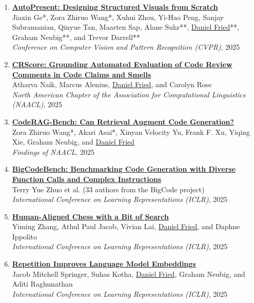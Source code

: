 \begin{enumerate}[leftmargin=-1mm,partopsep=0pt]
\item \href{https://arxiv.org/abs/2501.00912}{\textbf{AutoPresent: Designing Structured Visuals from Scratch}} \\
  Jiaxin Ge*, Zora Zhiruo Wang*, Xuhui Zhou, Yi-Hao Peng, Sanjay Subramanian, Qinyue Tan, Maarten Sap, Alane Suhr**, \underline{Daniel Fried}**, Graham Neubig**, and Trevor Darrell**\\
  \emph{Conference on Computer Vision and Pattern Recognition (CVPR)}, 2025

\item \href{https://arxiv.org/abs/2409.19801}{\textbf{CRScore: Grounding Automated Evaluation of Code Review Comments in Code Claims and Smells}} \\
  Atharva Naik, Marcus Alenius, \underline{Daniel Fried}, and Carolyn Rose\\
  \emph{North American Chapter of the Association for Computational Linguistics (NAACL)}, 2025

\item \href{https://arxiv.org/abs/2406.14497}{\textbf{{CodeRAG-Bench}: Can Retrieval Augment Code Generation?}} \\
  Zora Zhiruo Wang*, Akari Asai*, Xinyan Velocity Yu, Frank F. Xu, Yiqing Xie, Graham Neubig, and \underline{Daniel Fried}\\
  \emph{Findings of NAACL}, 2025

\item \href{https://arxiv.org/abs/2406.15877}{\textbf{{BigCodeBench}: Benchmarking Code Generation with Diverse Function Calls and Complex Instructions}} \\
  Terry Yue Zhuo et al. (33 authors from the BigCode project)\\
  \emph{International Conference on Learning Representations (ICLR)}, 2025

\item \href{https://arxiv.org/abs/2410.03893}{\textbf{Human-Aligned Chess with a Bit of Search}} \\
  Yiming Zhang, Athul Paul Jacob, Vivian Lai, \underline{Daniel Fried}, and Daphne Ippolito\\
  \emph{International Conference on Learning Representations (ICLR)}, 2025

\item \href{https://arxiv.org/abs/2402.15449}{\textbf{Repetition Improves Language Model Embeddings}} \\
  Jacob Mitchell Springer, Suhas Kotha, \underline{Daniel Fried}, Graham Neubig, and Aditi Raghunathan\\
  \emph{International Conference on Learning Representations (ICLR)}, 2025


\end{enumerate}
